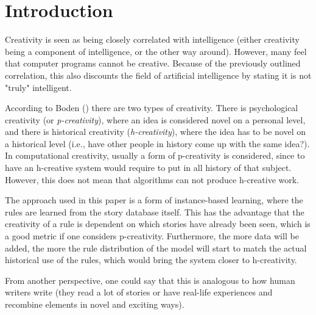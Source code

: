\section{Introduction}
Creativity is seen as being closely correlated with intelligence (either
creativity being a component of intelligence, or the other way around).
However, many feel that computer programs cannot be creative. Because of the
previously outlined correlation, this also discounts the field of artificial
intelligence by stating it is not "truly" intelligent.

According to Boden (\cite{Boden1998347})
there are two types of creativity. There is psychological creativity (or
\emph{p-creativity}), where an idea is considered novel on a personal level, and
there is historical creativity (\emph{h-creativity}), where the idea has to be
novel on a historical level (i.e., have other people in history come up with the
same idea?).
In computational creativity, usually a form of p-creativity is considered, since
to have an h-creative system would require to put in all history of that
subject. However, this does not mean that algorithms can not produce h-creative
work.


The approach used in this paper is a form of instance-based learning, where the
rules are learned from the story database itself. This has the advantage that
the creativity of a rule is dependent on which stories have already been seen,
which is a good metric if one considers p-creativity. Furthermore, the more data
will be added, the more the rule distribution of the model will start to match 
the actual historical use of the rules, which would bring the system closer to
h-creativity.

From another perspective, one could say that this is analogous to how human
writers write (they read a lot of stories or have real-life experiences and 
recombine elements in novel and exciting ways).
